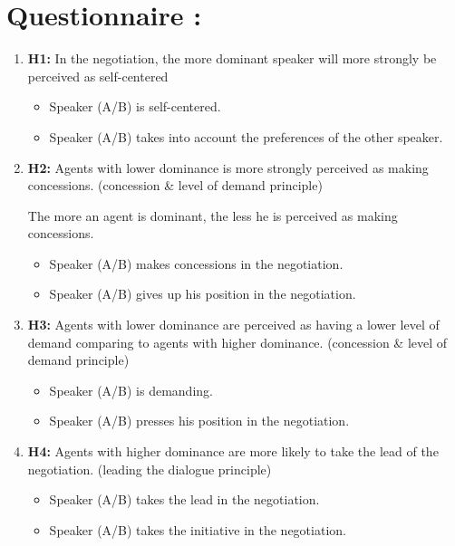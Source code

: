 \documentclass{article}
\begin{document}
	\section{Questionnaire :}
	
	
		\begin{enumerate}
			

		\item  \textbf{H1:} In the negotiation, the more dominant speaker will more strongly be perceived as self-centered
				\begin{itemize}
				\item Speaker (A/B) is self-centered.
				\item Speaker (A/B) takes into account the preferences of the other speaker. 
					\end{itemize}  
		
		\item \textbf{H2:} Agents with lower dominance is more strongly perceived as making concessions. (concession \& level of demand principle)
		
			The more an agent is dominant, the less he is perceived as making concessions.
			

				\begin{itemize}
						\item Speaker (A/B) makes concessions in the negotiation.
						\item Speaker (A/B) gives up his position in the negotiation.
				\end{itemize} 
				
				
		\item \textbf{H3:} Agents with lower dominance are perceived as having a lower level of demand comparing to agents with higher dominance. (concession \& level of demand principle)

				\begin{itemize}
						\item Speaker (A/B) is demanding.
						\item Speaker (A/B) presses his position in the negotiation.
				\end{itemize} 
				
				
		\item \textbf{H4:} Agents with higher dominance are more likely to take the lead of the negotiation. (leading the dialogue principle)

		\begin{itemize}
				\item Speaker (A/B) takes the lead in the negotiation.
				\item Speaker (A/B) takes the initiative in the negotiation. 
		\end{itemize}
		

\end{enumerate}
\end{document}
